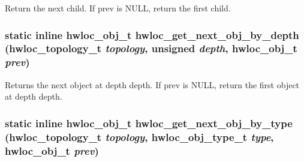 Return the next child. If {\ttfamily prev} is {\ttfamily NULL}, return the first child. \hypertarget{group__hwlocality__helper__traversal__basic_ga5755cecb9124c5181642ac84dc5bc554}{
\subsubsection[{hwloc\_\-get\_\-next\_\-obj\_\-by\_\-depth}]{\setlength{\rightskip}{0pt plus 5cm}static inline {\bf hwloc\_\-obj\_\-t} hwloc\_\-get\_\-next\_\-obj\_\-by\_\-depth ({\bf hwloc\_\-topology\_\-t} {\em topology}, \/  unsigned {\em depth}, \/  {\bf hwloc\_\-obj\_\-t} {\em prev})}}
\label{group__hwlocality__helper__traversal__basic_ga5755cecb9124c5181642ac84dc5bc554}


Returns the next object at depth {\ttfamily depth}. If {\ttfamily prev} is {\ttfamily NULL}, return the first object at depth {\ttfamily depth}. \hypertarget{group__hwlocality__helper__traversal__basic_gad011fce572551516267de3c57241a326}{
\subsubsection[{hwloc\_\-get\_\-next\_\-obj\_\-by\_\-type}]{\setlength{\rightskip}{0pt plus 5cm}static inline {\bf hwloc\_\-obj\_\-t} hwloc\_\-get\_\-next\_\-obj\_\-by\_\-type ({\bf hwloc\_\-topology\_\-t} {\em topology}, \/  {\bf hwloc\_\-obj\_\-type\_\-t} {\em type}, \/  {\bf hwloc\_\-obj\_\-t} {\em prev})}}
\label{group__hwlocality__helper__traversal__basic_gad011fce572551516267de3c57241a326}


